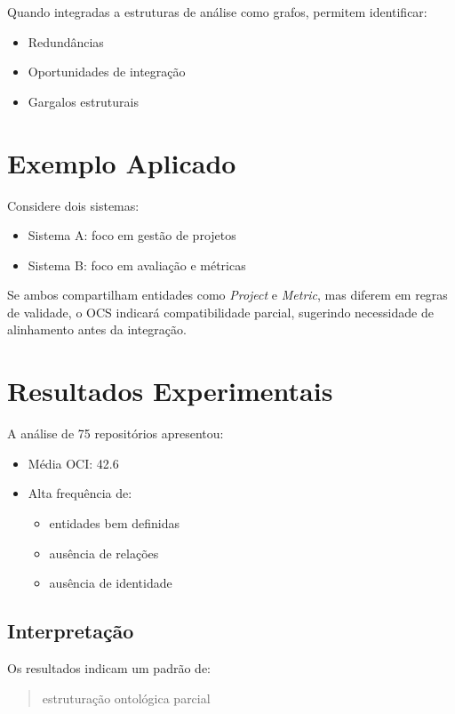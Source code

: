 \documentclass[12pt,a4paper]{article}
\begin{document}
	Quando integradas a estruturas de análise como grafos, permitem identificar:

	\begin{itemize}
		\item Redundâncias
		\item Oportunidades de integração
		\item Gargalos estruturais
	\end{itemize}

	\section{Exemplo Aplicado}

	Considere dois sistemas:

	\begin{itemize}
		\item Sistema A: foco em gestão de projetos
		\item Sistema B: foco em avaliação e métricas
	\end{itemize}

	Se ambos compartilham entidades como \textit{Project} e \textit{Metric}, mas diferem em regras de validade, o OCS indicará compatibilidade parcial, sugerindo necessidade de alinhamento antes da integração.

\section{Resultados Experimentais}

A análise de 75 repositórios apresentou:

\begin{itemize}
	\item Média OCI: 42.6
	\item Alta frequência de:
	\begin{itemize}
		\item entidades bem definidas
		\item ausência de relações
		\item ausência de identidade
	\end{itemize}
\end{itemize}

\subsection{Interpretação}

Os resultados indicam um padrão de:

\begin{quote}
	estruturação ontológica parcial
\end{quote}
\end{document}
